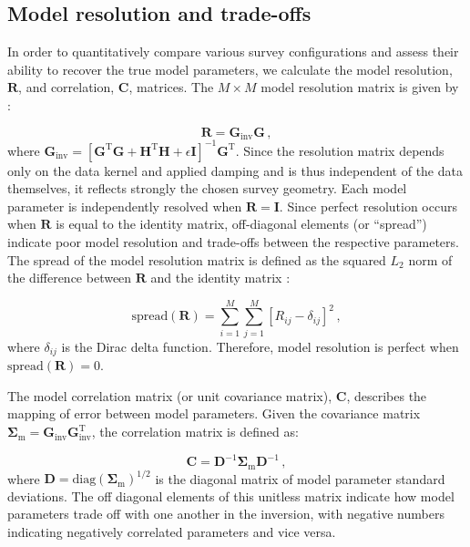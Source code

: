 \documentclass[10pt,titlepage]{article}
\begin{document}
\subsection{Model resolution and trade-offs}
In order to quantitatively compare various survey configurations and assess their ability to recover the true model parameters, we calculate the model resolution, $\mathbf{R}$, and correlation, $\mathbf{C}$, matrices. The $M \times M$ model resolution matrix is given by \citep{Menke2018}:

\begin{equation}
\mathbf{R} = \mathbf{G}_{\text{inv}} \mathbf{G} \,,
\end{equation}
where $\mathbf{G}_{\text{inv}}= \left[ \mathbf{G}^{\text{T}} \mathbf{G} + \mathbf{H}^{\text{T}} \mathbf{H} + \epsilon\mathbf{I} \right]^{-1} \mathbf{G}^{\text{T}}$. Since the resolution matrix depends only on the data kernel and applied damping and is thus independent of the data themselves, it reflects strongly the chosen survey geometry. Each model parameter is independently resolved when $\mathbf{R}=\mathbf{I}$. Since perfect resolution occurs when $\mathbf{R}$ is equal to the identity matrix, off-diagonal elements (or ``spread'') indicate poor model resolution and trade-offs between the respective parameters. The spread of the model resolution matrix is defined as the squared $L_2$ norm of the difference between $\mathbf{R}$ and the identity matrix \citep{Menke2018}:

\begin{equation}
\text{spread}(\mathbf{R}) = \sum_{i=1}^M\sum_{j=1}^M \left[ R_{ij}-\delta_{ij}\right]^2 \,,
\end{equation}
where $\delta_{ij}$ is the Dirac delta function. Therefore, model resolution is perfect when $\text{spread}(\mathbf{R})=0$.

The model correlation matrix (or unit covariance matrix), $\mathbf{C}$, describes the mapping of error between model parameters. Given the covariance matrix $\mathbf{\Sigma}_{\text{m}} = \mathbf{G}_{\text{inv}} \mathbf{G}_{\text{inv}}^{\text{T}}$, the correlation matrix is defined as:

\begin{equation}
\mathbf{C} = \mathbf{D}^{-1}\mathbf{\Sigma}_{\text{m}}\mathbf{D}^{-1} \,,
\end{equation}
where $\mathbf{D} = \text{diag}(\mathbf{\Sigma}_{\text{m}})^{1/2}$ is the diagonal matrix of model parameter standard deviations. The off diagonal elements of this unitless matrix indicate how model parameters trade off with one another in the inversion, with negative numbers indicating negatively correlated parameters and vice versa.
\end{document}
